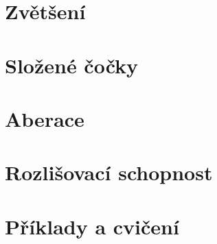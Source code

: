 {  \section{Zvětšení}\label{fyz:IchapXXVIIsecIV}
  \section{Složené čočky}\label{fyz:IchapXXVIIsecV}
  \section{Aberace}\label{fyz:IchapXXVIIsecVI}
  \section{Rozlišovací schopnost}\label{fyz:IchapXXVIIsecVII}
  \section{Příklady a cvičení}\label{fyz:IchapXXVIIsecVIII}
  
} %
\printbibliography[title={Seznam literatury}, heading=subbibliography]
